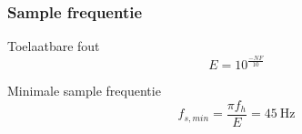 \begin{frame}
    \frametitle{Sample frequentie}
    \centering
    
    Toelaatbare fout
    \begin{equation*}\label{eq:ADCmaxSampleError}
        E=10^{\frac{-NF}{10}}
    \end{equation*}
    \pause

    Minimale sample frequentie
    \begin{equation*}\label{eq:ADCminFs}
        f_{s,min}=\frac{\pi f_h}{E}= \qty{45}{\hertz}
    \end{equation*}

\end{frame}
